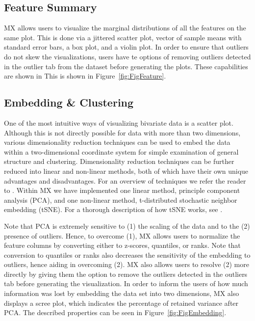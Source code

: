 \documentclass[12pt]{article}
\begin{document}
\subsection{Feature Summary}
\label{subsec:SubSecFeature}

MX allows users to visualize the marginal distributions of all the features on the same plot. This is done via a jittered scatter plot, vector of sample means with standard error bars, a box plot, and a violin plot. In order to ensure that outliers do not skew the visualizations, users have te options of removing outliers detected in the outlier tab from the dataset before generating the plots. These capabilities are shown in This is shown in  Figure~\ref{fig:FigFeature}.

\subsection{Embedding \& Clustering}
\label{subsec:SubSecEmbedding}

One of the most intuitive ways of visualizing bivariate data is a scatter plot. Although this is not directly possible for data with more than two dimensions, various dimensionality reduction techniques can be used to embed the data within a two-dimensional coordinate system for simple examination of general structure and clustering. Dimensionality reduction techniques can be further reduced into linear and non-linear methods, both of which have their own unique advantages and disadvantages. For an overview of techniques we refer the reader to \cite{van2009dimensionality}. Within MX we have implemented one linear method, principle component analysis (PCA), and one non-linear method, t-distributed stochastic neighbor embedding (tSNE). For a thorough description of how tSNE works, see \cite{van2008visualizing}.

Note that PCA is extremely sensitive to (1) the scaling of the data and to the (2) presence of outliers.  Hence, to overcome (1), MX allows users to normalize the feature columns by converting either to z-scores, quantiles, or ranks. Note that conversion to quantiles or ranks also decreases the sensitivity of the embedding to outliers, hence aiding in overcoming (2). MX also allows users to resolve (2) more directly by giving them the option to remove the outliers detected in the outliers tab before generating the visualization. In order to inform the users of how much information was lost by embedding the data set into two dimensions, MX also displays a scree plot, which indicates the percentage of retained variance after PCA. The described properties can be seen in Figure~\ref{fig:FigEmbedding}.
\end{document}

